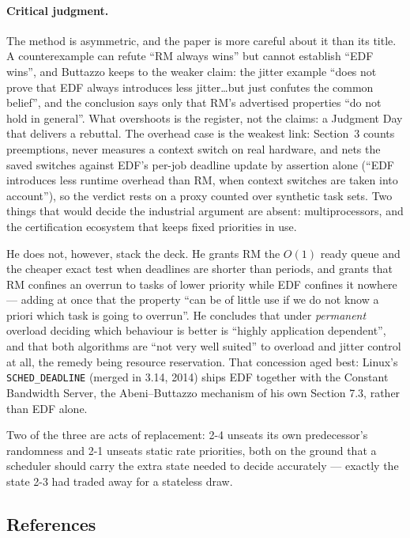 \paragraph{Critical judgment.}
The method is asymmetric, and the paper is more careful about it than its title. A counterexample
can refute ``RM always wins'' but cannot establish ``EDF wins'', and Buttazzo keeps to the weaker
claim: the jitter example ``does not prove that EDF always introduces less jitter\ldots but just
confutes the common belief'', and the conclusion says only that RM's advertised properties ``do
not hold in general''. What overshoots is the register, not the claims: a Judgment Day that
delivers a rebuttal. The overhead case is the weakest link: Section~3 counts preemptions, never measures a
context switch on real hardware, and nets the saved switches against EDF's per-job deadline
update by assertion alone (``EDF introduces less runtime overhead than RM, when context switches
are taken into account''), so the verdict rests on a proxy counted over synthetic task sets. Two
things that would decide the industrial argument are absent: multiprocessors, and the
certification ecosystem that keeps fixed priorities in use.

He does not, however, stack the deck. He grants RM the $O(1)$ ready queue and the cheaper exact
test when deadlines are shorter than periods, and grants that RM confines an overrun to tasks of
lower priority while EDF confines it nowhere --- adding at once that the property ``can be of
little use if we do not know a priori which task is going to overrun''. He concludes that under
\emph{permanent} overload deciding which behaviour is better is ``highly application dependent'',
and that both algorithms are ``not very well suited'' to overload and jitter control at all, the
remedy being resource reservation. That concession aged best:
Linux's
\texttt{SCHED\_DEADLINE} (merged in 3.14, 2014) ships EDF together with the Constant Bandwidth
Server, the Abeni--Buttazzo mechanism of his own Section 7.3, rather than EDF alone.

\medskip
Two of the three are acts of replacement: 2-4 unseats its own predecessor's randomness and 2-1
unseats static rate priorities, both on the ground that a scheduler should carry the extra state
needed to decide accurately --- exactly the state 2-3 had traded away for a stateless draw.

\subsection*{References}

